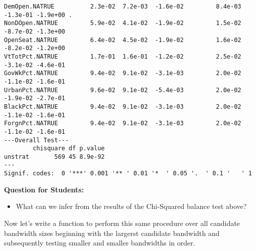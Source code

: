 \documentclass[11pt,leqno]{article}\usepackage[]{graphicx}\usepackage[]{color}
\makeatletter
\newenvironment{kframe}{%
 \def\at@end@of@kframe{}%
 \ifinner\ifhmode%
  \def\at@end@of@kframe{\end{minipage}}%
  \begin{minipage}{\columnwidth}%
 \fi\fi%
 \def\FrameCommand##1{\hskip\@totalleftmargin \hskip-\fboxsep
 \colorbox{shadecolor}{##1}\hskip-\fboxsep
     \hskip-\linewidth \hskip-\@totalleftmargin \hskip\columnwidth}%
 \MakeFramed {\advance\hsize-\width
   \@totalleftmargin\z@ \linewidth\hsize
   \@setminipage}}%
 {\par\unskip\endMakeFramed%
 \at@end@of@kframe}
\newenvironment{knitrout}{}{} %
\theoremstyle{newstyle}
\makeatother
\begin{document}
\begin{knitrout}
\begin{kframe}
\begin{verbatim}
DemOpen.NATRUE          2.3e-02  7.2e-03  -1.6e-02         8.4e-03  -1.3e-01 -1.9e+00 .       
NonDOpen.NATRUE         5.9e-02  4.1e-02  -1.9e-02         1.5e-02  -8.7e-02 -1.3e+00         
OpenSeat.NATRUE         6.4e-02  4.5e-02  -1.9e-02         1.6e-02  -8.2e-02 -1.2e+00         
VtTotPct.NATRUE         1.7e-01  1.6e-01  -1.2e-02         2.5e-02  -3.1e-02 -4.6e-01         
GovWkPct.NATRUE         9.4e-02  9.1e-02  -3.1e-03         2.0e-02  -1.1e-02 -1.6e-01         
UrbanPct.NATRUE         9.6e-02  9.1e-02  -5.4e-03         2.0e-02  -1.9e-02 -2.7e-01         
BlackPct.NATRUE         9.4e-02  9.1e-02  -3.1e-03         2.0e-02  -1.1e-02 -1.6e-01         
ForgnPct.NATRUE         9.4e-02  9.1e-02  -3.1e-03         2.0e-02  -1.1e-02 -1.6e-01         
---Overall Test---
        chisquare df p.value
unstrat       569 45 8.9e-92
---
Signif. codes:  0 '***' 0.001 '** ' 0.01 '*  ' 0.05 '.  ' 0.1 '   ' 1 
\end{verbatim}
\end{kframe}
\end{knitrout}

\vspace{5mm}
\begin{mdframed}
\textbf{Question for Students:}
\vspace{-5mm}
\begin{itemize}\itemsep1pt
\item What can we infer from the results of the Chi-Squared balance test above?
\end{itemize}
\end{mdframed}

Now let's write a function to perform this same procedure over all candidate bandwidth sizes beginning with the largerst candidate bandwidth and subsequently testing smaller and smaller bandwidths in order.
\end{document}
